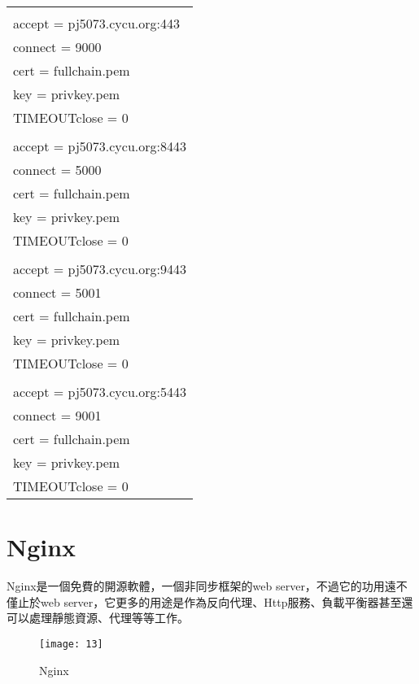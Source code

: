 \par
\begin{center}
\begin{tabular}{||p{15cm}|} %
\hline
[https]
\\
accept  = pj5073.cycu.org:443
\\
connect = 9000
\\
cert = fullchain.pem
\\
key = privkey.pem
\\
TIMEOUTclose = 0
\\ 
[https]
\\
accept = pj5073.cycu.org:8443
\\
connect = 5000
\\
cert = fullchain.pem
\\
key = privkey.pem
\\
TIMEOUTclose = 0
\\
[https]
\\
accept = pj5073.cycu.org:9443
\\
connect = 5001
\\
cert = fullchain.pem
\\
key = privkey.pem
\\
TIMEOUTclose = 0
\\
[https]
\\
accept = pj5073.cycu.org:5443
\\
connect = 9001
\\
cert = fullchain.pem
\\
key = privkey.pem
\\
TIMEOUTclose = 0
\\
\hline
\end{tabular}
\end{center}
\par

\renewcommand{\baselinestretch}{20} %
\section{Nginx}
\par
\renewcommand{\baselinestretch}{1} %
\twelve \qquad Nginx是一個免費的開源軟體，一個非同步框架的web server，不過它的功用遠不僅止於web server，它更多的用途是作為反向代理、Http服務、負載平衡器甚至還可以處理靜態資源、代理等等工作。
\\
\par
\renewcommand{\baselinestretch}{1.7} %
\begin{figure}[hbt!]
\begin{center}
\texttt{[image: 13]}
\caption{\large Nginx}\label{fig.Nginx}
\end{center}
\end{figure}
\par

